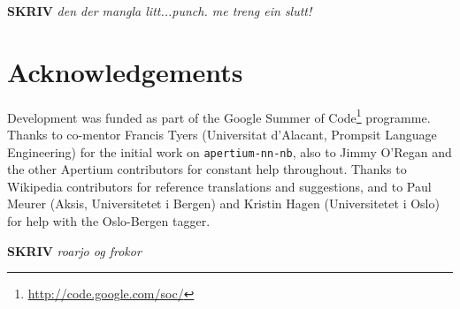 \documentclass[11pt]{article}
\newcommand{\comment}[1]{\textbf{SKRIV} {\it #1}}
\begin{document}
\comment{den der mangla litt...punch. me treng ein slutt!}


\section*{Acknowledgements}

Development was funded as part of the Google Summer of
Code\footnote{\href{http://code.google.com/soc/}{http://code.google.com/soc/}
} programme. Thanks to co-mentor Francis Tyers (Universitat d'Alacant,
Prompsit Language Engineering) for the initial work on {\tt apertium-nn-nb},
also to Jimmy O'Regan and the other Apertium contributors for constant
help throughout. Thanks to Wikipedia contributors for reference
translations and suggestions, and to Paul Meurer (Aksis, Universitetet
i Bergen) and Kristin Hagen (Universitetet i Oslo) for help with the
Oslo-Bergen tagger.

\comment{ roarjo og frokor}




\end{document}
